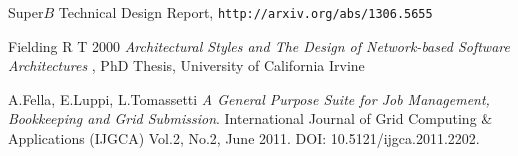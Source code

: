 \documentclass[a4paper]{jpconf}
\begin{document}
\begin{thebibliography}{30}




Super$B$ Technical Design Report, \verb"http://arxiv.org/abs/1306.5655"

Fielding R T 2000 {\it Architectural Styles and The Design of Network-based
Software Architectures }, PhD Thesis, University of California Irvine

A.Fella, E.Luppi, L.Tomassetti \emph{A General Purpose Suite for Job Management, Bookkeeping and Grid Submission}. International Journal of Grid Computing \& Applications (IJGCA) Vol.2, No.2, June 2011. DOI: 10.5121/ijgca.2011.2202.

\end{thebibliography}
\end{document}
